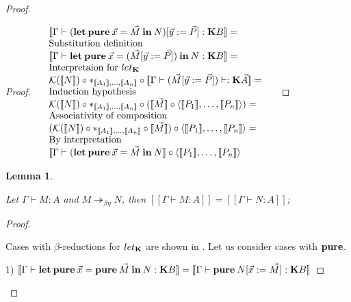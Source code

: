 \documentclass[a4paper]{article}
\newtheorem{lemma}{Lemma}
\begin{document}
\begin{proof}
\begin{proof}
\vspace{\baselineskip}

$\begin{array}{lll}
&[\![\Gamma \vdash ({\bf let \: pure} \: \vec{x} = \vec{M} {\: \bf in \:} N) [\vec{y} := \vec{P}] : {\bf K} B]\!] =& \\
&\text{Substitution definition}& \\
&[\![\Gamma \vdash {\bf let \: pure} \: \vec{x} = (\vec{M} [\vec{y} := \vec{P}]) {\: \bf in \:} N : {\bf K}B]\!] =& \\
&\text{Interpretaion for $let_{\bf K}$}& \\
&\mathcal{K}([\![N]\!]) \circ \ast_{[\![A_1]\!],\dots,[\![A_n]\!]} \circ [\![\Gamma \vdash (\vec{M} [\vec{y} := \vec{P}]) \vdash : {\bf K}\vec{A}]\!] =& \\
&\text{Induction hypothesis}& \\
&\mathcal{K}([\![N]\!]) \circ \ast_{[\![A_1]\!],\dots,[\![A_n]\!]} \circ ([\![\vec{M}]\!] \circ \langle [\![P_1]\!],\dots,[\![P_n]\!]\rangle) = & \\
&\text{Associativity of composition}& \\
&(\mathcal{K}([\![N]\!]) \circ \ast_{[\![A_1]\!],\dots,[\![A_n]\!]} \circ [\![\vec{M}]\!]) \circ \langle [\![P_1]\!],\dots,[\![P_n]\!]\rangle = & \\
&\text{By interpretation}&\\
&[\![\Gamma \vdash ({\bf let \: pure} \: \vec{x} = \vec{M} {\: \bf in \:} N]\!] \circ \langle [\![P_1]\!],\dots,[\![P_n]\!]\rangle&
\end{array}$

\end{proof}

\begin{lemma}
  $ $

  Let $\Gamma \vdash M : A$ and $M \twoheadrightarrow_{\beta \eta} N$, then $[\![\Gamma \vdash M : A]\!] = [\![\Gamma \vdash N : A]\!]$;
\end{lemma}

\begin{proof}
  $ $

Cases with $\beta$-reductions for $let_{\bf K}$ are shown in \cite{ModalK1}. Let us consider cases with ${\bf pure}$.

\vspace{\baselineskip}

1) $[\![\Gamma \vdash {\bf let \: pure \:} \vec{x} = {\bf pure \:} \vec{M} {\: \bf in \:} N : {\bf K}B]\!] = [\![\Gamma \vdash {\bf pure \:} N [\vec{x} := \vec{M}] : {\bf K}B]\!]$


\end{proof}
\end{proof}
\end{document}
